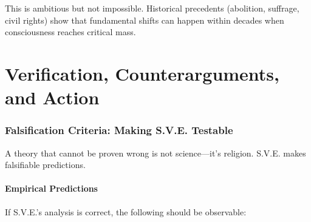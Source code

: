 \documentclass[11pt,a4paper]{article}
\theoremstyle{definition}
\theoremstyle{remark}
\begin{document}
This is ambitious but not impossible. Historical precedents (abolition, suffrage, civil rights) show that fundamental shifts can happen within decades when consciousness reaches critical mass.

\part{Verification, Counterarguments, and Action}

\section{Falsification Criteria: Making S.V.E. Testable}

A theory that cannot be proven wrong is not science---it's religion. S.V.E. makes falsifiable predictions.

\subsection{Empirical Predictions}

If S.V.E.'s analysis is correct, the following should be observable:
\end{document}
